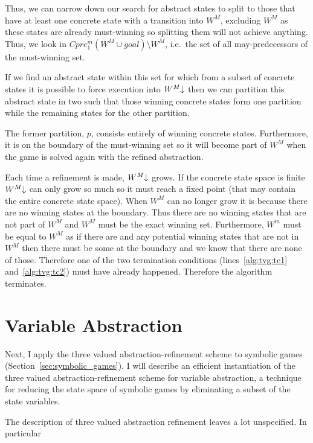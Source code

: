 Thus, we can narrow down our search for abstract states to split to those that have at least one concrete state with a transition into $W^M$, excluding $W^M$ as these states are already must-winning so splitting them will not achieve anything. Thus, we look in $Cpre_1^m(W^M \cup goal)\setminus W^M$, i.e.\ the set of all may-predecessors of the must-winning set. 

If we find an abstract state within this set for which from a subset of concrete states it is possible to force execution into $W^M\mathord{\downarrow}$ then we can partition this abstract state in two such that those winning concrete states form one partition while the remaining states for the other partition.

The former partition, $p$, consists entirely of winning concrete states. Furthermore, it is on the boundary of the must-winning set so it will become part of $W^M$ when the game is solved again with the refined abstraction.

Each time a refinement is made, $W^M\mathord{\downarrow}$ grows. If the concrete state space is finite $W^M\mathord{\downarrow}$ can only grow so much so it must reach a fixed point (that may contain the entire concrete state space). When $W^M$ can no longer grow it is because there are no winning states at the boundary. Thus there are no winning states that are not part of $W^M$ and $W^M$ must be the exact winning set. Furthermore, $W^m$ must be equal to $W^M$ as if there are and any potential winning states that are not in $W^M$ then there must be some at the boundary and we know that there are none of those. Therefore one of the two termination conditions (lines~\ref{alg:tvg:tc1} and~\ref{alg:tvg:tc2}) must have already happened. Therefore the algorithm terminates.

\section{Variable Abstraction}
\label{sec:variable_abstraction}

Next, I apply the three valued abstraction-refinement scheme to symbolic games (Section~\ref{sec:symbolic_games}). I will describe an efficient instantiation of the three valued abstraction-refinement scheme for variable abstraction, a technique for reducing the state space of symbolic games by eliminating a subset of the state variables.

The description of three valued abstraction refinement leaves a lot unspecified. In particular

